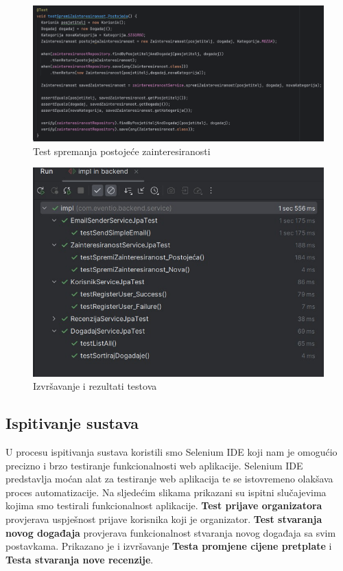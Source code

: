 			\begin{figure}[H]
				\includegraphics[scale=0.45]{testovi/zainteresiranostTest2.png}
				\centering
				\caption{Test spremanja postojeće zainteresiranosti}
				\label{fig:promjene}
			\end{figure}
			
				\begin{figure}[H]
				\includegraphics[scale=0.45]{testovi/unit_testovi.jpeg}
				\centering
				\caption{Izvršavanje i rezultati testova}
				\label{fig:promjene}
			\end{figure}
			
			
			\subsection{Ispitivanje sustava}
			
			U procesu ispitivanja sustava koristili smo Selenium IDE koji nam je omogućio precizno i brzo testiranje funkcionalnosti web aplikacije. Selenium IDE predstavlja moćan alat za testiranje web aplikacija te se istovremeno olakšava proces automatizacije. \newline Na sljedećim slikama prikazani su ispitni slučajevima kojima smo testirali funkcionalnost aplikacije. \textbf{Test prijave organizatora} provjerava uspješnost prijave korisnika koji je organizator. \textbf{Test stvaranja novog događaja} provjerava funkcionalnost stvaranja novog događaja sa svim postavkama. Prikazano je i izvršavanje \textbf{Testa promjene cijene pretplate} i \textbf{Testa stvaranja nove recenzije}.
			
